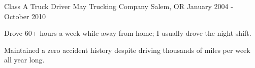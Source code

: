 \begin{cventries}
\vspace{-6mm}
\cventry
{Class A Truck Driver} %
{May Trucking Company} %
{Salem, OR} %
{January 2004 - October 2010} %
{ %
\begin{cvitems}
\item {Drove 60+ hours a week while away from home; I usually drove the night shift.}
\item {Maintained a zero accident history despite driving thousands of miles per week all year long.}
\end{cvitems}
}



\end{cventries}
